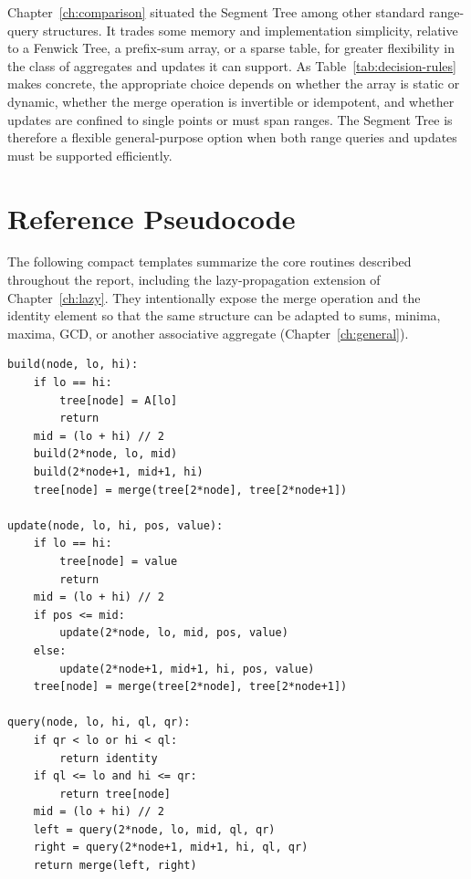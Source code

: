 \documentclass[
  11pt,
  a4paper,
  twoside=false,
  numbers=noenddot,
  headings=big,
  parskip=half,
  toc=bibliography,
  toc=listof,
  bibliography=totoc
]{scrreprt}
\begin{document}
Chapter~\ref{ch:comparison} situated the Segment Tree among other standard range-query structures. It trades some memory and implementation simplicity, relative to a Fenwick Tree, a prefix-sum array, or a sparse table, for greater flexibility in the class of aggregates and updates it can support. As Table~\ref{tab:decision-rules} makes concrete, the appropriate choice depends on whether the array is static or dynamic, whether the merge operation is invertible or idempotent, and whether updates are confined to single points or must span ranges. The Segment Tree is therefore a flexible general-purpose option when both range queries and updates must be supported efficiently.

\appendix
\chapter{Reference Pseudocode}

The following compact templates summarize the core routines described throughout the report, including the lazy-propagation extension of Chapter~\ref{ch:lazy}. They intentionally expose the merge operation and the identity element so that the same structure can be adapted to sums, minima, maxima, GCD, or another associative aggregate (Chapter~\ref{ch:general}).

\begin{lstlisting}[caption={Core build, point-update, and range-query routines (no lazy propagation).}]
build(node, lo, hi):
    if lo == hi:
        tree[node] = A[lo]
        return
    mid = (lo + hi) // 2
    build(2*node, lo, mid)
    build(2*node+1, mid+1, hi)
    tree[node] = merge(tree[2*node], tree[2*node+1])

update(node, lo, hi, pos, value):
    if lo == hi:
        tree[node] = value
        return
    mid = (lo + hi) // 2
    if pos <= mid:
        update(2*node, lo, mid, pos, value)
    else:
        update(2*node+1, mid+1, hi, pos, value)
    tree[node] = merge(tree[2*node], tree[2*node+1])

query(node, lo, hi, ql, qr):
    if qr < lo or hi < ql:
        return identity
    if ql <= lo and hi <= qr:
        return tree[node]
    mid = (lo + hi) // 2
    left = query(2*node, lo, mid, ql, qr)
    right = query(2*node+1, mid+1, hi, ql, qr)
    return merge(left, right)
\end{lstlisting}
\end{document}
